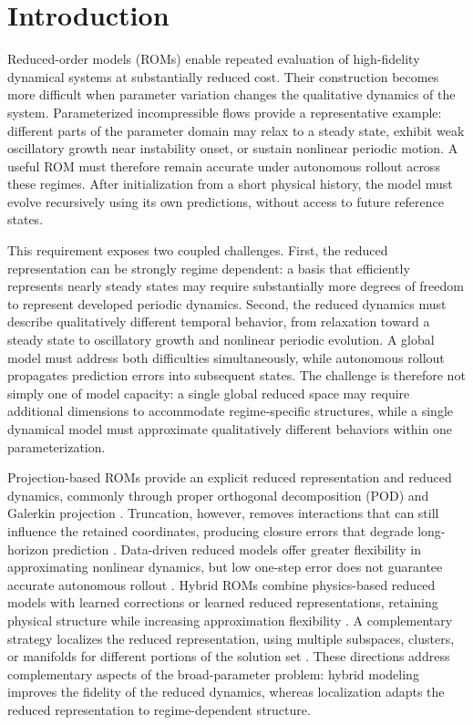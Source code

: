 \section{Introduction}

Reduced-order models (ROMs) enable repeated evaluation of high-fidelity dynamical systems at substantially reduced cost. Their construction becomes more difficult when parameter variation changes the qualitative dynamics of the system. Parameterized incompressible flows provide a representative example: different parts of the parameter domain may relax to a steady state, exhibit weak oscillatory growth near instability onset, or sustain nonlinear periodic motion. A useful ROM must therefore remain accurate under autonomous rollout across these regimes. After initialization from a short physical history, the model must evolve recursively using its own predictions, without access to future reference states.



This requirement exposes two coupled challenges. First, the reduced representation can be strongly regime dependent: a basis that efficiently represents nearly steady states may require substantially more degrees of freedom to represent developed periodic dynamics. Second, the reduced dynamics must describe qualitatively different temporal behavior, from relaxation toward a steady state to oscillatory growth and nonlinear periodic evolution. A global model must address both difficulties simultaneously, while autonomous rollout propagates prediction errors into subsequent states. The challenge is therefore not simply one of model capacity: a single global reduced space may require additional dimensions to accommodate regime-specific structures, while a single dynamical model must approximate qualitatively different behaviors within one parameterization.


Projection-based ROMs provide an explicit reduced representation and reduced dynamics, commonly through proper orthogonal decomposition (POD) and
Galerkin projection \citep{sirovich1987,berkooz1993,benner2015}. Truncation, however, removes interactions that can still influence the retained coordinates, producing closure errors that degrade long-horizon prediction \citep{amsallem2012}. Data-driven reduced models offer greater flexibility in approximating nonlinear dynamics, but low one-step error does not guarantee accurate autonomous rollout \citep{pathak2018,vlachas2018,duraisamy2019,brunton2020}. Hybrid ROMs combine physics-based reduced models with learned corrections or learned reduced representations, retaining physical structure while increasing approximation flexibility
\citep{dar2023,lee2020,fresca2022,geelen2023}. A complementary strategy localizes the reduced representation, using multiple subspaces, clusters, or manifolds for different portions of the solution set \citep{kaiser2014,li2021cluster,diaz2024}. These directions address complementary aspects of the broad-parameter problem: hybrid modeling improves the fidelity of the reduced dynamics, whereas localization adapts the reduced representation to regime-dependent structure.

